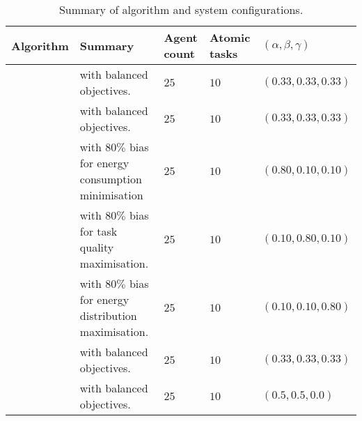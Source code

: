 
\begin{table}[h]
	\begin{tabular}
		{|p{}|p{}|p{}|p{}|p{}|}
		\hline
		\textbf{Algorithm} & \textbf{Summary} & \textbf{Agent count} & \textbf{Atomic tasks}  & \textbf{$(\alpha,\beta,\gamma)$}\\
		\hline
		\algorithmBalancedSimple{}{} &  \acronymWSNOptimisation{}{}  with balanced objectives. & $25$ & $10$    & $(0.33,0.33,0.33)$  \\
		\algorithmBaselineSimple{}{} &  \acronymBaseline{}{} with balanced objectives. & $25$ & $10$    & $(0.33,0.33,0.33)$  \\
		\algorithmEnergy{}{} & \acronymWSNOptimisation{}{}  with $80\%$ bias for energy consumption minimisation  & $25$ & $10$   & $(0.80,0.10,0.10)$  \\
		\algorithmQuality{}{} & \acronymWSNOptimisation{}{}  with $80\%$ bias for task quality maximisation. & $25$ & $10$   & $(0.10,0.80,0.10)$  \\
		\algorithmDistribution{}{} & \acronymWSNOptimisation{}{}  with $80\%$ bias for energy distribution maximisation. & $25$ & $10$  & $(0.10,0.10,0.80)$  \\
		\algorithmFailure{}{} &  \acronymWSNOptimisation{}{}  with balanced objectives. & $25$ & $10$   & $(0.33,0.33,0.33)$  \\
		\algorithmBaselineFailure{}{} &  \acronymBaseline{}{} with balanced objectives.  & $25$ & $10$ & $(0.5,0.5,0.0)$  \\
		
		\hline
	\end{tabular}
	\captionsetup{labelfont=bf,singlelinecheck=on}
	\caption{Summary of algorithm and system configurations.}
	\label{table:summary_of_configurations}
\end{table}

